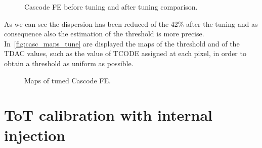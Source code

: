 \begin{figure}[h!]
\centering
{}\quad
{}\quad
{}\quad
\caption{Cascode FE before tuning and after tuning comparison.}
\label{fig:casc_tuning}
\end{figure}

As we can see the dispersion has been reduced of the 42\% after the tuning and as consequence also the estimation of the threshold is more precise. In~\autoref{fig:casc_maps_tune} are displayed the maps of the threshold and of the TDAC values, such as the value of TCODE assigned at each pixel, in order to obtain a threshold as uniform as possible. \\

\begin{comment}
In more details, there are three step for tuning:

\begin{itemize}
\item launch a first threshold scan through the internal charge injection, with a TDAC value equal for all pixels (usually default value is TDAC= 4).
\item start a TDAC analysis which allows to choose a target threshold. During this phase, a tool tries to assign the optimized value of TDAC at each pixel in several steps, in order to get as close as possible to the set threshold. At the end it returns the final TDAC values for all selected pixels.
\item At last another scan is launched setting the TDAC of each pixel passing the TDAC map values obtained from the previous. 
\end{itemize}
\end{comment}

\begin{figure}[h!]
\centering
{}\quad
{}\quad
\caption{Maps of tuned Cascode FE.}
\label{fig:casc_maps_tune}
\end{figure}


\section{ToT calibration with internal injection}

